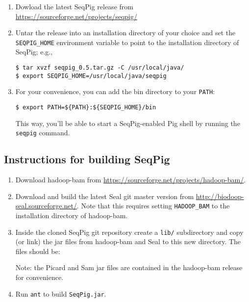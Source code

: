\begin{enumerate}
\item Dowload the latest SeqPig release from \url{https://sourceforge.net/projects/seqpig/}
\item Untar the release into an installation directory of your choice and set the {\tt SEQPIG\_HOME}
  environment variable to point to the installation directory of SeqPig; e.g.,
%
\begin{lstlisting} 
$ tar xvzf seqpig_0.5.tar.gz -C /usr/local/java/
$ export SEQPIG_HOME=/usr/local/java/seqpig 
\end{lstlisting}
%
\item For your convenience, you can add the bin directory to your {\tt PATH}:
%
\begin{lstlisting} 
$ export PATH=${PATH}:${SEQPIG_HOME}/bin
\end{lstlisting}
%
This way, you'll be able to start a SeqPig-enabled Pig shell by running the {\tt
seqpig} command.
\end{enumerate}

\subsection{Instructions for building SeqPig}

\begin{enumerate}
\item Download hadoop-bam from \url{https://sourceforge.net/projects/hadoop-bam/}.
\item Download and build the latest Seal git master version from
 \url{http://biodoop-seal.sourceforge.net/}. Note that this requires setting
 {\tt HADOOP\_BAM} to the installation directory of hadoop-bam.

\item Inside the cloned SeqPig git repository create a
{\tt lib/} subdirectory and copy (or link) the jar files
from hadoop-bam and Seal to this new directory.  The files should be:
%
Note: the Picard and Sam jar files are contained in the hadoop-bam release
for convenience.

\item Run {\tt ant} to build {\tt SeqPig.jar}.
\end{enumerate}

